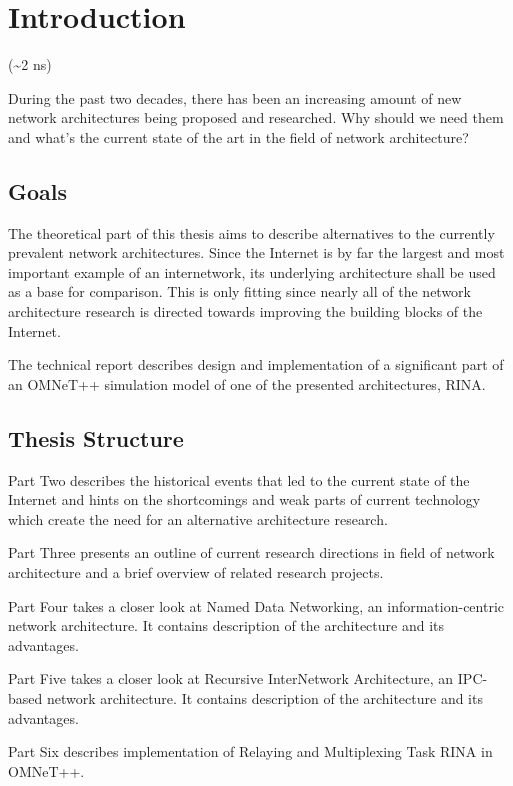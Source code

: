 
\chapter{Introduction}
    (\textasciitilde2 ns)

    During the past two decades, there has been an increasing amount of new network architectures being proposed and researched. Why should we need them and what's the current state of the art in the field of network architecture?

    \section{Goals}
        The theoretical part of this thesis aims to describe alternatives to the currently prevalent network architectures. Since the Internet is by far the largest and most important example of an internetwork, its underlying architecture shall be used as a base for comparison. This is only fitting since nearly all of the network architecture research is directed towards improving the building blocks of the Internet.

        The technical report describes design and implementation of a significant part of an OMNeT++ simulation model of one of the presented architectures, RINA.

    \section{Thesis Structure}

        Part Two describes the historical events that led to the current state of the Internet and hints on the shortcomings and weak parts of current technology which create the need for an alternative architecture research.

        Part Three presents an outline of current research directions in field of network architecture and a brief overview of related research projects.

        Part Four takes a closer look at Named Data Networking, an information-centric network architecture. It contains description of the architecture and its advantages.

        Part Five takes a closer look at Recursive InterNetwork Architecture, an IPC-based network architecture. It contains description of the architecture and its advantages.

        Part Six describes implementation of Relaying and Multiplexing Task RINA in OMNeT++.

